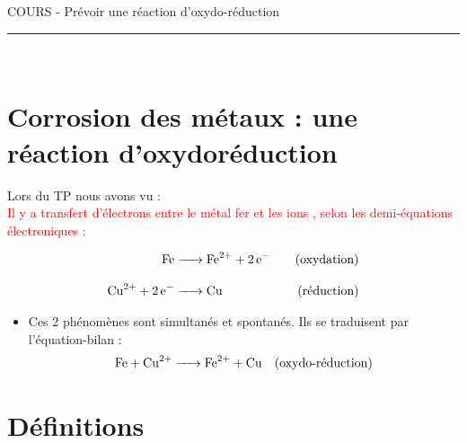 \documentclass[11pt,a4paper]{article}
\newcommand{\cor}[1]{%
  \begin{tcolorbox}[
    colback=red!10,
    colframe=red,
    arc=3mm,
    boxrule=1pt,
    left=5pt,
    right=5pt,
    top=15pt,
    bottom=5pt
  ]
  #1
  \end{tcolorbox}
}
\begin{document}
\center \LARGE{COURS - Prévoir une réaction d'oxydo-réduction}
\\[0,3cm]

\normalsize

\hrule\
\\[1cm]

\flushleft
\section{Corrosion des métaux : une réaction d'oxydoréduction}

Lors du TP nous avons vu : \\[0.8cm]

\textcolor{red}{Il y a transfert d'électrons entre le métal fer et les ions , selon les demi-équations électroniques :}  \\[0.8cm]

\cor{
\vspace{-8mm}
\Large
\begin{align*}
\ce{Fe &-> Fe^{2+} + 2 e^-} \quad &\text{(oxydation)} \\[3mm]
\ce{Cu^{2+} + 2 e^- &-> Cu} \quad &\text{(réduction)}
\end{align*}
}

\vspace{5mm}

\normalsize
\begin{itemize}
\item Ces 2 phénomènes sont simultanés et spontanés. Ils se traduisent par l'équation-bilan : \\[0.5cm]

\Large{\textcolor{red}{
\begin{equation*}
\ce{Fe + Cu^{2+} -> Fe^{2+} + Cu} \quad \text{(oxydo-réduction)}
\end{equation*}
}
}\end{itemize}


\section{Définitions}
\end{document}
